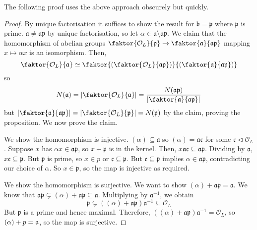 The following proof uses the above approach obscurely but quickly.
\begin{proof}
    By unique factorisation it suffices to show the result for \( \mathfrak b = \mathfrak p \) where \( \mathfrak p \) is prime.
    \( \mathfrak a \neq \mathfrak a \mathfrak p \) by unique factorisation, so let \( \alpha \in \mathfrak a \setminus \mathfrak a \mathfrak p \).
    We claim that the homomorphism of abelian groups \( \faktor{\mathcal O_L}{\mathfrak p} \to \faktor{\mathfrak a}{\mathfrak a \mathfrak p} \) mapping \( x \mapsto \alpha x \) is an isomorphism.
    Then,
    \[ \faktor{\mathcal O_L}{\mathfrak a} \simeq \faktor{\qty(\faktor{\mathcal O_L}{\mathfrak a \mathfrak p})}{\qty(\faktor{\mathfrak a}{\mathfrak a\mathfrak p})} \]
    so
    \[ N(\mathfrak a) = \abs{\faktor{\mathcal O_L}{\mathfrak a}} = \frac{N(\mathfrak a\mathfrak p)}{\abs{\faktor{\mathfrak a}{\mathfrak a \mathfrak p}}} \]
    but \( \abs{\faktor{\mathfrak a}{\mathfrak a \mathfrak p}} = \abs{\faktor{\mathcal O_L}{\mathfrak p}} = N(\mathfrak p) \) by the claim, proving the proposition.
    We now prove the claim.

    We show the homomorphism is injective.
    \( (\alpha) \subseteq \mathfrak a \) so \( (\alpha) = \mathfrak a \mathfrak c \) for some \( \mathfrak c \triangleleft \mathcal O_L \).
    Suppose \( x \) has \( \alpha x \in \mathfrak a \mathfrak p \), so \( x + \mathfrak p \) is in the kernel.
    Then, \( x \mathfrak a \mathfrak c \subseteq \mathfrak a \mathfrak p \).
    Dividing by \( \mathfrak a \), \( x\mathfrak c \subseteq \mathfrak p \).
    But \( \mathfrak p \) is prime, so \( x \in p \) or \( \mathfrak c \subseteq \mathfrak p \).
    But \( \mathfrak c \subseteq \mathfrak p \) implies \( \alpha \in \mathfrak a \mathfrak p \), contradicting our choice of \( \alpha \).
    So \( x \in \mathfrak p \), so the map is injective as required.

    We show the homomorphism is surjective.
    We want to show \( (\alpha) + \mathfrak a \mathfrak p = \mathfrak a \).
    We know that \( \mathfrak a \mathfrak p \subsetneq (\alpha) + \mathfrak a \mathfrak p \subseteq \mathfrak a \).
    Multiplying by \( \mathfrak a^{-1} \), we obtain
    \[ \mathfrak p \subsetneq ((\alpha) + \mathfrak a \mathfrak p) \mathfrak a^{-1} \subseteq \mathcal O_L \]
    But \( \mathfrak p \) is a prime and hence maximal.
    Therefore, \( ((\alpha) + \mathfrak a \mathfrak p) \mathfrak a^{-1} = \mathcal O_L \), so \( (\alpha) + \mathfrak \mathfrak p = \mathfrak a \), so the map is surjective.
\end{proof}
